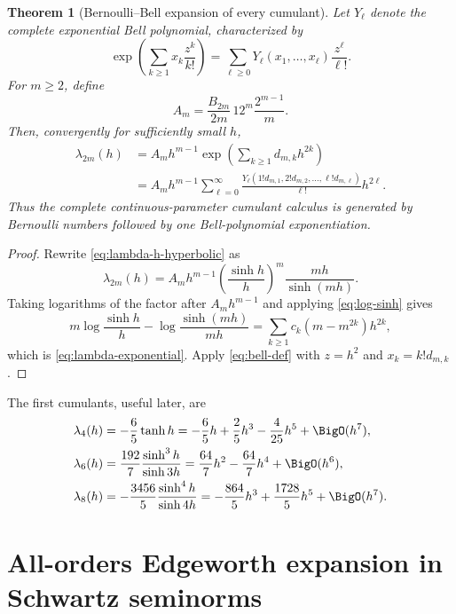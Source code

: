 \documentclass[11pt]{article}
\numberwithin{equation}{section}
\newtheorem{theorem}{Theorem}[section]
\theoremstyle{definition}
\begin{document}
\begin{theorem}[Bernoulli--Bell expansion of every cumulant]\label{thm:cumulant-bell}
Let \(Y_\ell\) denote the complete exponential Bell polynomial, characterized by
\begin{equation}\label{eq:bell-def}
 \exp\!\left(\sum_{k\ge1}x_k\frac{z^k}{k!}\right)
 =\sum_{\ell\ge0}Y_\ell(x_1,\ldots,x_\ell)\frac{z^\ell}{\ell!}.
\end{equation}
For \(m\ge2\), define
\begin{equation}\label{eq:Am}
 A_m=\frac{B_{2m}}{2m}\,12^m\frac{2^{m-1}}{m}.
\end{equation}
Then, convergently for sufficiently small \(h\),
\begin{align}
 \lambda_{2m}(h)
 &=A_mh^{m-1}
   \exp\!\left(\sum_{k\ge1}d_{m,k}h^{2k}\right)\label{eq:lambda-exponential}\\
 &=A_mh^{m-1}\sum_{\ell=0}^{\infty}
 \frac{Y_\ell(1!d_{m,1},2!d_{m,2},\ldots,\ell!d_{m,\ell})}{\ell!}
 h^{2\ell}.\label{eq:lambda-bell}
\end{align}
Thus the complete continuous-parameter cumulant calculus is generated by Bernoulli numbers followed by one Bell-polynomial exponentiation.
\end{theorem}

\begin{proof}
Rewrite \eqref{eq:lambda-h-hyperbolic} as
\[
 \lambda_{2m}(h)=A_mh^{m-1}
 \left(\frac{\sinh h}{h}\right)^m\frac{mh}{\sinh(mh)}.
\]
Taking logarithms of the factor after \(A_mh^{m-1}\) and applying \eqref{eq:log-sinh} gives
\[
 m\log\frac{\sinh h}{h}-\log\frac{\sinh(mh)}{mh}
 =\sum_{k\ge1}c_k(m-m^{2k})h^{2k},
\]
which is \eqref{eq:lambda-exponential}.  Apply \eqref{eq:bell-def} with \(z=h^2\) and \(x_k=k!d_{m,k}\).
\end{proof}

The first cumulants, useful later, are
\begin{align}
 \lambda_4(h)&=-\frac65\tanh h
 =-\frac65h+\frac25h^3-\frac4{25}h^5+\BigO(h^7),\label{eq:lambda4}\\
 \lambda_6(h)&=\frac{192}{7}\frac{\sinh^3h}{\sinh3h}
 =\frac{64}{7}h^2-\frac{64}{7}h^4+\BigO(h^6),\label{eq:lambda6}\\
 \lambda_8(h)&=-\frac{3456}{5}\frac{\sinh^4h}{\sinh4h}
 =-\frac{864}{5}h^3+\frac{1728}{5}h^5+\BigO(h^7).\label{eq:lambda8}
\end{align}

\section{All-orders Edgeworth expansion in Schwartz seminorms}\label{sec:edgeworth}
\end{document}
